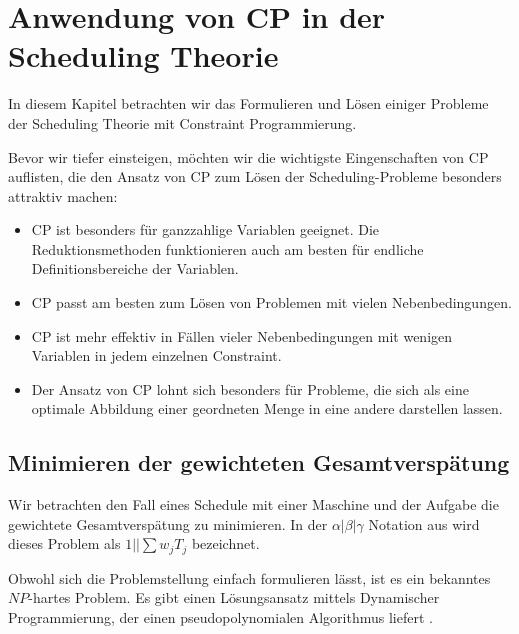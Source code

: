 \chapter{ Anwendung von CP in der Scheduling Theorie}

In diesem Kapitel betrachten wir das Formulieren und Lösen einiger Probleme der Scheduling Theorie mit Constraint Programmierung.

Bevor wir tiefer einsteigen, möchten wir die wichtigste Eingenschaften von CP auflisten, die den Ansatz von CP zum Lösen der Scheduling-Probleme besonders attraktiv machen:
\begin{itemize} \itemsep0pt
	\item CP ist besonders für ganzzahlige Variablen geeignet. Die Reduktionsmethoden funktionieren auch am besten für endliche Definitionsbereiche der Variablen.
	\item CP passt am besten zum Lösen von Problemen mit vielen Nebenbedingungen.
	\item CP ist mehr effektiv in Fällen vieler Nebenbedingungen mit wenigen Variablen in jedem einzelnen Constraint.
	\item Der Ansatz von CP lohnt sich besonders für Probleme, die sich als eine optimale Abbildung einer geordneten Menge in eine andere darstellen lassen.
\end{itemize}


\section{Minimieren der gewichteten Gesamtverspätung}
Wir betrachten den Fall eines Schedule mit einer Maschine und der Aufgabe die gewichtete Gesamtverspätung zu minimieren. In der $\alpha|\beta|\gamma$ Notation aus \cite{Pinedo} wird dieses Problem als $1||\sum{w_jT_j}$ bezeichnet.

Obwohl sich die Problemstellung einfach formulieren lässt, ist es ein bekanntes $NP$-hartes Problem. Es gibt einen Lösungsansatz mittels Dynamischer Programmierung, der einen pseudopolynomialen Algorithmus liefert \citep[vgl.][]{Pinedo}.

%
%


